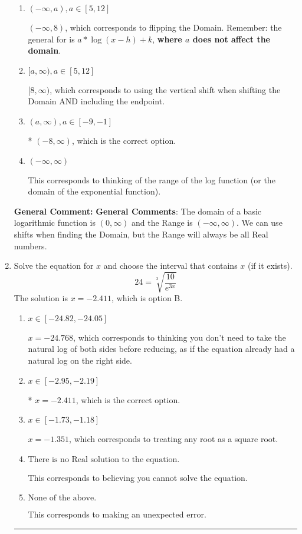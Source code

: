 \documentclass{extbook}[14pt]
\newcommand{\litem}[1]{\item #1

\rule{\textwidth}{0.4pt}}
\begin{document}
\begin{enumerate}
{\begin{enumerate}[label=\Alph*.]
$(-\infty, -8]$, which corresponds to using the negative vertical shift AND including the endpoint AND flipping the domain.
\item \( (-\infty, a), a \in [5, 12] \)

$(-\infty, 8)$, which corresponds to flipping the Domain. Remember: the general for is $a*\log(x-h)+k$, \textbf{where $a$ does not affect the domain}.
\item \( [a, \infty), a \in [5, 12] \)

$[8, \infty)$, which corresponds to using the vertical shift when shifting the Domain AND including the endpoint.
\item \( (a, \infty), a \in [-9, -1] \)

* $(-8, \infty)$, which is the correct option.
\item \( (-\infty, \infty) \)

This corresponds to thinking of the range of the log function (or the domain of the exponential function).
\end{enumerate}

\textbf{General Comment:} \textbf{General Comments}: The domain of a basic logarithmic function is $(0, \infty)$ and the Range is $(-\infty, \infty)$. We can use shifts when finding the Domain, but the Range will always be all Real numbers.
}
\litem{
 Solve the equation for $x$ and choose the interval that contains $x$ (if it exists).
\[  24 = \sqrt[3]{\frac{10}{e^{3x}}} \]The solution is \( x = -2.411 \), which is option B.\begin{enumerate}[label=\Alph*.]
\item \( x \in [-24.82, -24.05] \)

$x = -24.768$, which corresponds to thinking you don't need to take the natural log of both sides before reducing, as if the equation already had a natural log on the right side.
\item \( x \in [-2.95, -2.19] \)

* $x = -2.411$, which is the correct option.
\item \( x \in [-1.73, -1.18] \)

$x = -1.351$, which corresponds to treating any root as a square root.
\item \( \text{There is no Real solution to the equation.} \)

This corresponds to believing you cannot solve the equation.
\item \( \text{None of the above.} \)

This corresponds to making an unexpected error.
\end{enumerate}

}
\end{enumerate}
\end{document}
